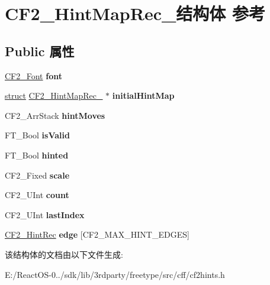 \hypertarget{struct_c_f2___hint_map_rec__}{}\section{C\+F2\+\_\+\+Hint\+Map\+Rec\+\_\+结构体 参考}
\label{struct_c_f2___hint_map_rec__}
\subsection*{Public 属性}
\begin{DoxyCompactItemize}
\item 
\mbox{\label{struct_c_f2___hint_map_rec___ad932da0e7dca5711d66c0096e8c6c8a6}} 
\hyperlink{struct_c_f2___font_rec__}{C\+F2\+\_\+\+Font} {\bfseries font}
\item 
\mbox{\label{struct_c_f2___hint_map_rec___a49301ddb08ea5ee9fc5b5baa54057332}} 
\hyperlink{interfacestruct}{struct} \hyperlink{struct_c_f2___hint_map_rec__}{C\+F2\+\_\+\+Hint\+Map\+Rec\+\_\+} $\ast$ {\bfseries initial\+Hint\+Map}
\item 
\mbox{\label{struct_c_f2___hint_map_rec___a3dd4b4268fde7eb09ea90ca6fa72cfe3}} 
C\+F2\+\_\+\+Arr\+Stack {\bfseries hint\+Moves}
\item 
\mbox{\label{struct_c_f2___hint_map_rec___a1f6c111123b6b1dda7455b662629b70f}} 
F\+T\+\_\+\+Bool {\bfseries is\+Valid}
\item 
\mbox{\label{struct_c_f2___hint_map_rec___a57967bbe892291cb4944eb4a36e6ed70}} 
F\+T\+\_\+\+Bool {\bfseries hinted}
\item 
\mbox{\label{struct_c_f2___hint_map_rec___a6aa2a0b5b89138ff77232957d3abd2c6}} 
C\+F2\+\_\+\+Fixed {\bfseries scale}
\item 
\mbox{\label{struct_c_f2___hint_map_rec___a15e66b6340fe6ce8ed9ffd7344b334cd}} 
C\+F2\+\_\+\+U\+Int {\bfseries count}
\item 
\mbox{\label{struct_c_f2___hint_map_rec___a47a0509e845b63c34e9a41a72eb73b9a}} 
C\+F2\+\_\+\+U\+Int {\bfseries last\+Index}
\item 
\mbox{\label{struct_c_f2___hint_map_rec___afc5cc774d56a9685cab55e2528619693}} 
\hyperlink{struct_c_f2___hint_rec__}{C\+F2\+\_\+\+Hint\+Rec} {\bfseries edge} \mbox{[}C\+F2\+\_\+\+M\+A\+X\+\_\+\+H\+I\+N\+T\+\_\+\+E\+D\+G\+ES\mbox{]}
\end{DoxyCompactItemize}


该结构体的文档由以下文件生成\+:\begin{DoxyCompactItemize}
\item 
E\+:/\+React\+O\+S-\/0../sdk/lib/3rdparty/freetype/src/cff/cf2hints.\+h\end{DoxyCompactItemize}
